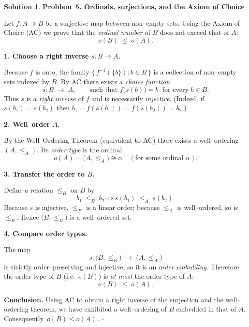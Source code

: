 \documentclass[12pt]{article}
\theoremstyle{definition} %
\newtheorem{solution}{Solution}
\theoremstyle{plain} %
\begin{document}
  \begin{solution}
    \textbf{Problem 5.  Ordinals, surjections, and the Axiom of Choice}
    
    Let \(f:A\twoheadrightarrow B\) be a surjective map between non–empty
    sets.  
    Using the Axiom of Choice (AC) we prove that the
    \emph{ordinal number} of \(B\) does not exceed that of \(A\):
    \[
          o(B)\;\le\;o(A).
    \]
    
    \medskip
    \textbf{1.  Choose a right inverse \(s:B\to A\).}
    
    Because \(f\) is onto, the family
    \(\bigl\{\,f^{-1}(\{b\}): b\in B\,\bigr\}\)
    is a collection of non–empty sets indexed by \(B\).
    By AC there exists a \emph{choice function}
    \[
          s:B\;\longrightarrow\;A,
          \qquad
          \text{such that } f\!\bigl(s(b)\bigr)=b
          \;\text{ for every }b\in B.
    \]
    Thus \(s\) is a \emph{right inverse} of \(f\) and is necessarily
    \emph{injective}.
    (Indeed, if \(s(b_1)=s(b_2)\) then
    \(b_1=f(s(b_1))=f(s(b_2))=b_2\).)
    
    \medskip
    \textbf{2.  Well–order \(A\).}
    
    By the Well–Ordering Theorem (equivalent to AC) there exists a
    well–ordering \((A,\le_A)\).
    Its \emph{order type} is the ordinal
    \[
          o(A)=\bigl(A,\le_A\bigr)\cong\alpha
          \quad(\text{for some ordinal }\alpha).
    \]
    
    \medskip
    \textbf{3.  Transfer the order to \(B\).}
    
    Define a relation \(\le_B\) on \(B\) by
    \[
          b_1\;\le_B\;b_2
          \iff
          s(b_1)\;\le_A\;s(b_2).
    \]
    Because \(s\) is injective, \(\le_B\) is a linear order;
    because \(\le_A\) is well–ordered, so is \(\le_B\).
    Hence \(\bigl(B,\le_B\bigr)\) is a well–ordered set.
    
    \medskip
    \textbf{4.  Compare order types.}
    
    The map
    \[
          s:\bigl(B,\le_B\bigr)\;\longrightarrow\;\bigl(A,\le_A\bigr)
    \]
    is strictly order–preserving and injective, so it is an
    \emph{order embedding}.
    Therefore the order type of \(B\) (i.e.\ \(o(B)\)) is \emph{at most}
    the order type of \(A\):
    \[
          o(B)\;\le\;o(A).
    \]
    
    \medskip
    \textbf{Conclusion.}
    Using AC to obtain a right inverse of the surjection and the
    well–ordering theorem, we have exhibited a well–ordering of \(B\)
    embedded in that of \(A\).  Consequently
    \(\boxed{\,o(B)\le o(A)\,}\).
    \(\square\)
    \end{solution}
\end{document}
